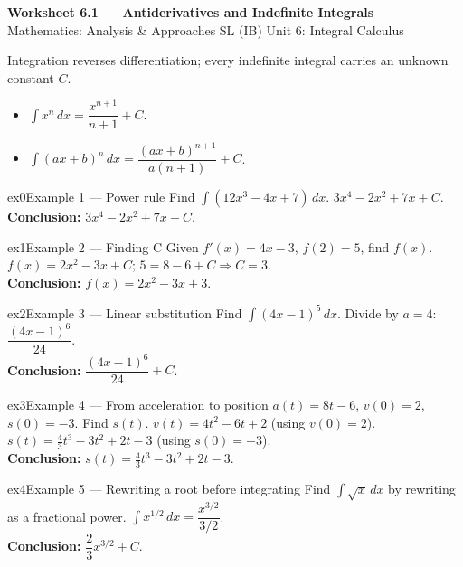 \documentclass[11pt]{article}
\begin{document}
\begin{center}
{\LARGE\bfseries\color{titleblue}Worksheet 6.1 --- Antiderivatives and Indefinite Integrals}\\[2pt]
{\small Mathematics: Analysis \& Approaches SL (IB) \textperiodcentered{} Unit 6: Integral Calculus}
\end{center}

\begin{ideabox}
Integration reverses differentiation; every indefinite integral carries an unknown constant $C$.
\begin{itemize}[leftmargin=*,itemsep=2pt]
  \item $\displaystyle\int x^n\,dx=\dfrac{x^{n+1}}{n+1}+C$.
  \item $\displaystyle\int(ax+b)^n\,dx=\dfrac{(ax+b)^{n+1}}{a(n+1)}+C$.
\end{itemize}
\end{ideabox}


\begin{example}{ex0}{Example 1 --- Power rule}
Find $\displaystyle\int(12x^3-4x+7)\,dx$.\soln
$3x^4-2x^2+7x+C$.\\[3pt]\textbf{Conclusion:} $3x^4-2x^2+7x+C$.
\end{example}

\begin{example}{ex1}{Example 2 --- Finding C}
Given $f'(x)=4x-3$, $f(2)=5$, find $f(x)$.\soln
$f(x)=2x^2-3x+C$; $5=8-6+C\Rightarrow C=3$.\\[3pt]\textbf{Conclusion:} $f(x)=2x^2-3x+3$.
\end{example}

\begin{example}{ex2}{Example 3 --- Linear substitution}
Find $\displaystyle\int(4x-1)^5\,dx$.\soln
Divide by $a=4$: $\dfrac{(4x-1)^6}{24}$.\\[3pt]\textbf{Conclusion:} $\dfrac{(4x-1)^6}{24}+C$.
\end{example}

\begin{example}{ex3}{Example 4 --- From acceleration to position}
$a(t)=8t-6$, $v(0)=2$, $s(0)=-3$. Find $s(t)$.\soln
$v(t)=4t^2-6t+2$ (using $v(0)=2$). $s(t)=\tfrac43t^3-3t^2+2t-3$ (using $s(0)=-3$).\\[3pt]\textbf{Conclusion:} $s(t)=\tfrac43t^3-3t^2+2t-3$.
\end{example}

\begin{example}{ex4}{Example 5 --- Rewriting a root before integrating}
Find $\displaystyle\int\sqrt x\,dx$ by rewriting as a fractional power.\soln
$\displaystyle\int x^{1/2}\,dx=\dfrac{x^{3/2}}{3/2}$.\\[3pt]\textbf{Conclusion:} $\dfrac23x^{3/2}+C$.
\end{example}
\end{document}
